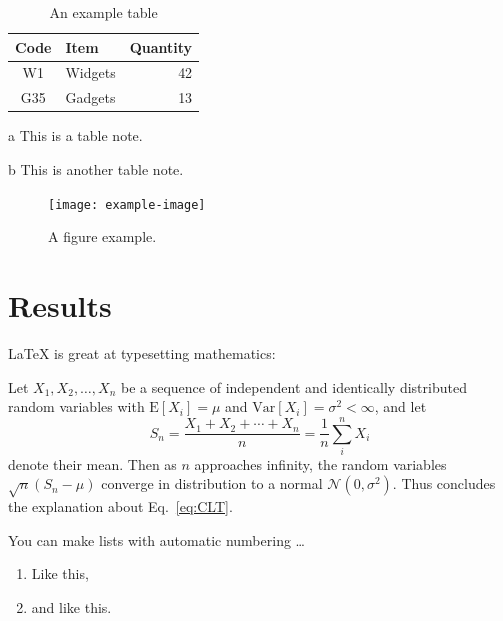 \documentclass{biophys-new}
\begin{document}
\begin{table}[hbt!]
\caption{An example table}
\label{tab:widgets}
\centering

\begin{threeparttable}

\begin{tabular}{c l r}
\hline
Code & Item & Quantity \\\hline
W1 & Widgets\tnote{a} & 42 \\
G35 & Gadgets & 13\tnote{b} \\
\hline
\end{tabular}

\begin{tablenotes}
\item[a] This is a table note.
\item[b] This is another table note.
\end{tablenotes}

\end{threeparttable}

\end{table}

\begin{figure}[hbt!]
\centering
\texttt{[image: example-image]}
\caption{A figure example.}
\label{fig:view}

\end{figure}

\section*{Results}

\LaTeX{} is great at typesetting mathematics:

Let $X_1, X_2, \ldots, X_n$ be a sequence of independent and identically distributed random variables with $\text{E}[X_i] = \mu$ and $\text{Var}[X_i] = \sigma^2 < \infty$, and let
\begin{equation}
\label{eq:CLT}
S_n = \frac{X_1 + X_2 + \cdots + X_n}{n}
      = \frac{1}{n}\sum_{i}^{n} X_i
\end{equation}
denote their mean. Then as $n$ approaches infinity, the random variables $\sqrt{n}(S_n - \mu)$ converge in distribution to a normal $\mathcal{N}(0, \sigma^2)$. Thus concludes the explanation about Eq.~\ref{eq:CLT}.


You can make lists with automatic numbering \dots

\begin{enumerate}
\item Like this,
\item and like this.
\end{enumerate}
\end{document}
